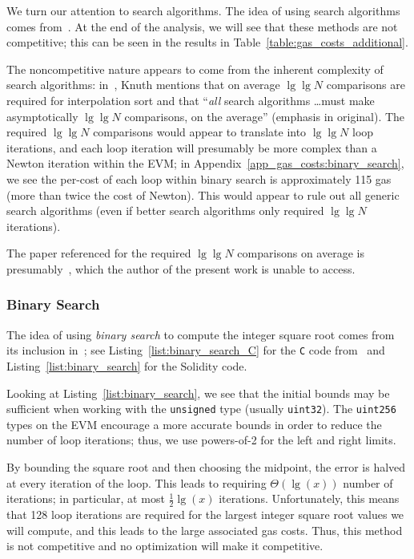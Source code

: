 We turn our attention to search algorithms.
The idea of using search algorithms comes
from~\cite[Chapter 11-1 Integer Square Root, Binary Search]{HackersDelight}.
At the end of the analysis,
we will see that these methods are not competitive;
this can be seen in the results in Table~\ref{table:gas_costs_additional}.

The noncompetitive nature appears to come from the
inherent complexity of search algorithms:
in~\cite[Page 425, Exercise 6.2.1.22]{TAOCPv3second},
Knuth mentions that on average $\lg\lg N$ comparisons are required
for interpolation sort
and that ``\emph{all} search algorithms \dots must make asymptotically
$\lg\lg N$ comparisons, on the average'' (emphasis in original).
The required $\lg\lg N$ comparisons would appear to translate into
$\lg\lg N$ loop iterations,
and each loop iteration will presumably be more complex
than a Newton iteration within the EVM;
in Appendix~\ref{app_gas_costs:binary_search},
we see the per-cost of each loop within binary search is
approximately 115 gas
(more than twice the cost of Newton).
This would appear to rule out all generic search algorithms
(even if better search algorithms only required $\lg\lg N$ iterations).

The paper referenced for the required $\lg\lg N$ comparisons on average
is presumably~\cite{YaoYaoSearching},
which the author of the present work is unable to access.

\subsubsection{Binary Search}

The idea of using \emph{binary search} to compute
the integer square root comes from its inclusion
in~\cite{HackersDelight};
see Listing~\ref{list:binary_search_C}
for the \texttt{C} code from~\cite{HackersDelightArchive}
and Listing~\ref{list:binary_search}
for the Solidity code.

Looking at Listing~\ref{list:binary_search},
we see that the initial bounds may be sufficient
when working with the \texttt{unsigned} type (usually \texttt{uint32}).
The \texttt{uint256} types on the EVM encourage a more accurate bounds
in order to reduce the number of loop iterations;
thus, we use powers-of-2 for the left and right limits.

By bounding the square root and then choosing the midpoint,
the error is halved at every iteration of the loop.
This leads to requiring $\Theta(\lg(x))$ number of iterations;
in particular, at most $\frac{1}{2}\lg(x)$ iterations.
Unfortunately, this means that 128 loop iterations are required
for the largest integer square root values we will compute,
and this leads to the large associated gas costs.
Thus, this method is not competitive and
no optimization will make it competitive.

